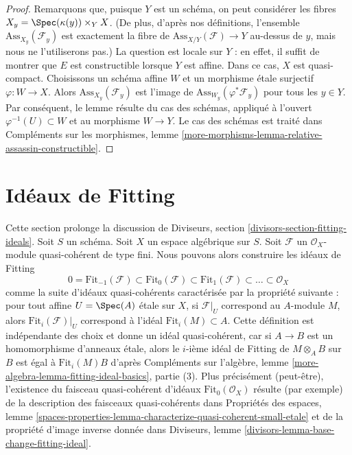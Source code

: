 \begin{proof}
Remarquons que, puisque $Y$ est un schéma, on peut considérer les fibres
$X_y = \Spec(\kappa(y)) \times_Y X$. (De plus, d'après nos définitions,
l'ensemble $\text{Ass}_{X_y}(\mathcal{F}_y)$ est exactement la fibre de
$\text{Ass}_{X/Y}(\mathcal{F}) \to Y$ au-dessus de $y$, mais nous ne l'utiliserons pas.)
La question est locale sur $Y$ : en effet, il suffit de montrer que
$E$ est constructible lorsque $Y$ est affine.
Dans ce cas, $X$ est quasi-compact. Choisissons un schéma affine $W$
et un morphisme \'etale surjectif $\varphi : W \to X$.
Alors $\text{Ass}_{X_y}(\mathcal{F}_y)$ est l'image de
$\text{Ass}_{W_y}(\varphi^*\mathcal{F}_y)$ pour tous les $y \in Y$.
Par conséquent, le lemme résulte du cas des schémas, appliqué à
l'ouvert $\varphi^{-1}(U) \subset W$ et au morphisme $W \to Y$.
Le cas des schémas est traité dans
Compléments sur les morphismes, lemme
\ref{more-morphisms-lemma-relative-assassin-constructible}.
\end{proof}









\section{Idéaux de Fitting}
\label{section-fitting-ideals}

\noindent
Cette section prolonge la discussion de
Diviseurs, section \ref{divisors-section-fitting-ideals}.
Soit $S$ un schéma. Soit $X$ un espace algébrique sur $S$.
Soit $\mathcal{F}$ un $\mathcal{O}_X$-module quasi-cohérent de type fini.
Nous pouvons alors construire les idéaux de Fitting
$$
0 = \text{Fit}_{-1}(\mathcal{F}) \subset \text{Fit}_0(\mathcal{F}) \subset
\text{Fit}_1(\mathcal{F}) \subset \ldots \subset \mathcal{O}_X
$$
comme la suite d'idéaux quasi-cohérents caractérisée par la
propriété suivante : pour tout affine $U = \Spec(A)$ \'etale sur $X$,
si $\mathcal{F}|_U$ correspond au $A$-module $M$, alors
$\text{Fit}_i(\mathcal{F})|_U$
correspond à l'idéal $\text{Fit}_i(M) \subset A$.
Cette définition est indépendante des choix et donne un idéal quasi-cohérent, car
si $A \to B$ est un homomorphisme d'anneaux \'etale, alors le $i$-ième idéal de Fitting
de $M \otimes_A B$ sur $B$ est égal à $\text{Fit}_i(M) B$ d'après
Compléments sur l'algèbre, lemme \ref{more-algebra-lemma-fitting-ideal-basics}, partie (3).
Plus précisément (peut-être), l'existence du faisceau quasi-cohérent d'idéaux
$\text{Fit}_0(\mathcal{O}_X)$ résulte (par exemple) de
la description des faisceaux quasi-cohérents dans
Propriétés des espaces, lemme
\ref{spaces-properties-lemma-characterize-quasi-coherent-small-etale}
et de la propriété d'image inverse donnée dans
Diviseurs, lemme \ref{divisors-lemma-base-change-fitting-ideal}.

